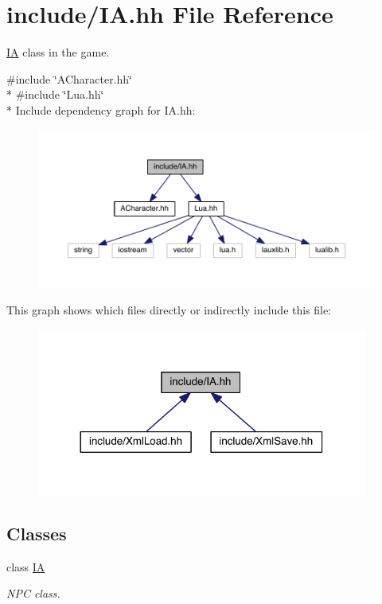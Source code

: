 \hypertarget{_i_a_8hh}{}\section{include/\+I\+A.hh File Reference}
\label{_i_a_8hh}


\hyperlink{class_i_a}{I\+A} class in the game.  


{\ttfamily \#include \char`\"{}A\+Character.\+hh\char`\"{}}\\*
{\ttfamily \#include \char`\"{}Lua.\+hh\char`\"{}}\\*
Include dependency graph for I\+A.\+hh\+:
\nopagebreak
\begin{figure}[H]
\begin{center}
\leavevmode
\includegraphics[width=350pt]{_i_a_8hh__incl}
\end{center}
\end{figure}
This graph shows which files directly or indirectly include this file\+:
\nopagebreak
\begin{figure}[H]
\begin{center}
\leavevmode
\includegraphics[width=308pt]{_i_a_8hh__dep__incl}
\end{center}
\end{figure}
\subsection*{Classes}
\begin{DoxyCompactItemize}
\item 
class \hyperlink{class_i_a}{I\+A}
\begin{DoxyCompactList}\small\item\em N\+P\+C class. \end{DoxyCompactList}\end{DoxyCompactItemize}
